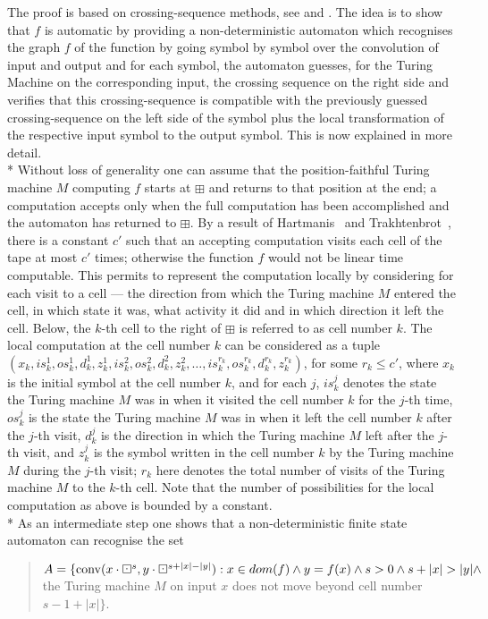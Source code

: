 \documentclass{LMCS}
\theoremstyle{plain}\newtheorem{athm}[thm]{Theorem}
\theoremstyle{plain}\newtheorem{aprop}[thm]{Proposition}
\theoremstyle{plain}\newtheorem{aprob}[thm]{Open Problem}
\theoremstyle{plain}\newtheorem{acor}[thm]{Corollary}
\theoremstyle{plain}\newtheorem{alem}[thm]{Lemma}
\theoremstyle{definition}\newtheorem{adefn}[thm]{Definition}
\theoremstyle{definition}\newtheorem{arem}[thm]{Remark}
\theoremstyle{plain}\newtheorem{aexmp}[thm]{Example}
\theoremstyle{plain}\newtheorem{aclm}[thm]{Claim}
\def\conv{{\rm{conv}}}
\def\sp{\\*\indent}
\begin{document}
\proof
The proof is based on crossing-sequence methods, see \cite{He65,He65b}
and \cite[Section VIII.1]{Od99}. The idea is to show that $f$ is automatic
by providing a non-deterministic automaton
which recognises the graph $f$ of the function by going
symbol by symbol over the convolution of input and output and for each
symbol, the automaton guesses, for the Turing Machine on the corresponding
input, the crossing sequence on the right side
and verifies that this crossing-sequence is
compatible with the previously guessed crossing-sequence on the
left side of the symbol plus the local transformation of the respective
input symbol to the output symbol. This is now explained in more detail.
\sp
Without loss of generality one can assume that the position-faithful
Turing machine $M$ computing $f$ starts at $\boxplus$
and returns to that position at the end; a computation accepts only when the
full computation has been accomplished and the automaton has returned to
$\boxplus$. By a result of Hartmanis~\cite{Ha68} and
Trakhtenbrot~\cite{Tr64}, there is a constant $c'$ such that an accepting
computation visits each cell of the tape at most $c'$ times; otherwise
the function $f$ would not be linear time computable. This permits to
represent the computation locally by considering for each visit to a cell --- 
the direction from which the Turing machine $M$ entered the cell, in which 
state it was, what activity it did and in which direction it left the cell. 
Below, the $k$-th cell to the right of $\boxplus$ is referred to as cell
number $k$.
The local computation at the cell number $k$
can be considered as a tuple
$(x_k,is^1_k,os_k^1,d_k^1,z_k^1, is_k^2,os_k^2,d_k^2,z_k^2, \ldots, 
is_k^{r_k},os_k^{r_k},d_k^{r_k},z_k^{r_k})$, for some $r_k \leq c'$,
where $x_k$ is the initial symbol at the cell number $k$, and for each $j$,
$is_k^j$ denotes the state the Turing machine $M$ was in
when it visited the cell number $k$ for the $j$-th time,
$os_k^j$ is the state the Turing machine $M$ was in when it 
left the cell number $k$ after the $j$-th visit,
$d_k^j$ is the direction in which the 
Turing machine $M$ left after the $j$-th visit,
and $z_k^j$ is the symbol written in the cell number $k$ 
by the Turing machine $M$
during the $j$-th visit;
$r_k$ here denotes the total number of visits of the Turing machine $M$
to the $k$-th cell. Note that the number of possibilities for
the local computation as above is bounded by a constant.
\sp
As an intermediate step one shows that
a non-deterministic finite state automaton can recognise the set
\begin{quote}
  $A = \{\conv(x\cdot \boxdot^s,y\cdot \boxdot^{s+|x|-|y|}): x \in dom(f)
  \wedge y = f(x) \wedge s>0 \wedge s+|x| > |y| \wedge$
  the Turing machine $M$ on input $x$
  does not move beyond cell number $s-1+|x|\}$.
\end{quote}
\end{document}
